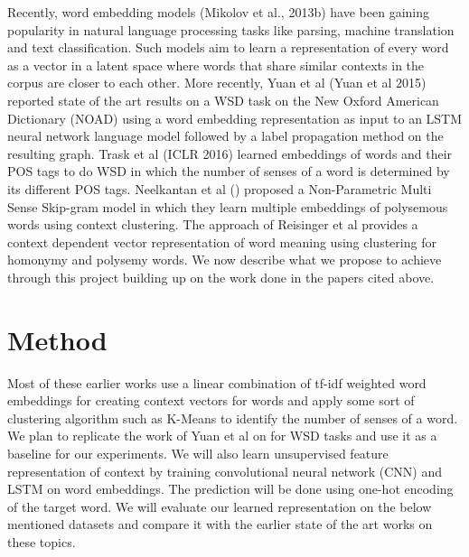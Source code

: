 \documentclass{article}
\begin{document}
Recently, word embedding models (Mikolov et al., 2013b) have been gaining popularity in natural language processing tasks like parsing, machine translation and text classification. Such models aim to learn a representation of every word as a vector in a latent space where words that share similar contexts in the corpus are closer to each other. More recently, Yuan et al (Yuan et al 2015) reported state of the art results on a WSD task on the New Oxford American Dictionary (NOAD) using a word embedding representation as input to an LSTM neural network language model followed by a label propagation method on the resulting graph. Trask et al (ICLR 2016) learned embeddings of words and their POS tags to do WSD in which the number of senses of a word is determined by its different POS tags. Neelkantan et al () proposed a Non-Parametric Multi Sense Skip-gram model in which they learn multiple embeddings of polysemous words using context clustering. The approach of Reisinger et al  provides a context dependent vector representation of word meaning using clustering for homonymy and polysemy words. We now describe what we propose to achieve through this project building up on the work done in the papers cited above.

\section{Method}
Most of these earlier works use a linear combination of tf-idf weighted word embeddings for creating context vectors for words and apply some sort of clustering algorithm such as K-Means to identify the number of senses of a word. We plan to replicate the work of Yuan et al on for WSD tasks and use it as a baseline for our experiments. We will also learn unsupervised feature representation of context by training convolutional neural network (CNN) and LSTM on word embeddings. The prediction will be done using one-hot encoding of the target word. We will evaluate our learned representation on the below mentioned datasets and compare it with the earlier state of the art works on these topics. 
\end{document}
